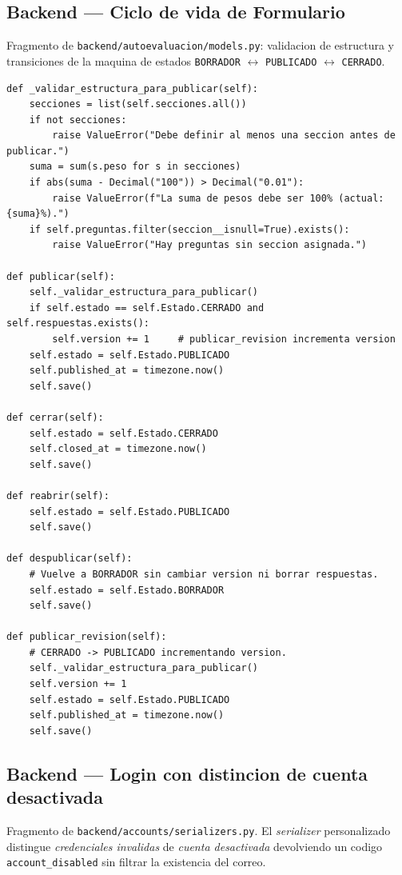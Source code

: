 \subsection{Backend --- Ciclo de vida de Formulario}\label{lst:formulario_states}

Fragmento de \texttt{backend/autoevaluacion/models.py}: validacion de estructura y transiciones de la maquina de estados \texttt{BORRADOR} $\leftrightarrow$ \texttt{PUBLICADO} $\leftrightarrow$ \texttt{CERRADO}.

\begin{Verbatim}[fontsize=\small, frame=single]
def _validar_estructura_para_publicar(self):
    secciones = list(self.secciones.all())
    if not secciones:
        raise ValueError("Debe definir al menos una seccion antes de publicar.")
    suma = sum(s.peso for s in secciones)
    if abs(suma - Decimal("100")) > Decimal("0.01"):
        raise ValueError(f"La suma de pesos debe ser 100% (actual: {suma}%).")
    if self.preguntas.filter(seccion__isnull=True).exists():
        raise ValueError("Hay preguntas sin seccion asignada.")

def publicar(self):
    self._validar_estructura_para_publicar()
    if self.estado == self.Estado.CERRADO and self.respuestas.exists():
        self.version += 1     # publicar_revision incrementa version
    self.estado = self.Estado.PUBLICADO
    self.published_at = timezone.now()
    self.save()

def cerrar(self):
    self.estado = self.Estado.CERRADO
    self.closed_at = timezone.now()
    self.save()

def reabrir(self):
    self.estado = self.Estado.PUBLICADO
    self.save()

def despublicar(self):
    # Vuelve a BORRADOR sin cambiar version ni borrar respuestas.
    self.estado = self.Estado.BORRADOR
    self.save()

def publicar_revision(self):
    # CERRADO -> PUBLICADO incrementando version.
    self._validar_estructura_para_publicar()
    self.version += 1
    self.estado = self.Estado.PUBLICADO
    self.published_at = timezone.now()
    self.save()
\end{Verbatim}

\subsection{Backend --- Login con distincion de cuenta desactivada}\label{lst:login_diff}

Fragmento de \texttt{backend/accounts/serializers.py}. El \emph{serializer} personalizado distingue \emph{credenciales invalidas} de \emph{cuenta desactivada} devolviendo un codigo \texttt{account\_disabled} sin filtrar la existencia del correo.

